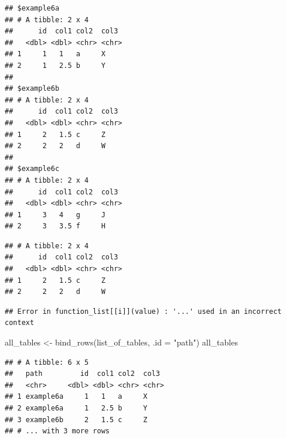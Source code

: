 \documentclass[]{book}
\newenvironment{Shaded}{}{}
\newcommand{\DataTypeTok}[1]{#1}
\newcommand{\KeywordTok}[1]{\textcolor[rgb]{0.00,0.00,1.00}{#1}}
\newcommand{\NormalTok}[1]{#1}
\newcommand{\OperatorTok}[1]{#1}
\newcommand{\StringTok}[1]{\textcolor[rgb]{0.00,0.50,0.50}{#1}}
\begin{document}
\begin{verbatim}
## $example6a
## # A tibble: 2 x 4
##      id  col1 col2  col3 
##   <dbl> <dbl> <chr> <chr>
## 1     1   1   a     X    
## 2     1   2.5 b     Y    
## 
## $example6b
## # A tibble: 2 x 4
##      id  col1 col2  col3 
##   <dbl> <dbl> <chr> <chr>
## 1     2   1.5 c     Z    
## 2     2   2   d     W    
## 
## $example6c
## # A tibble: 2 x 4
##      id  col1 col2  col3 
##   <dbl> <dbl> <chr> <chr>
## 1     3   4   g     J    
## 2     3   3.5 f     H
\end{verbatim}

\begin{Shaded}
\end{Shaded}

\begin{verbatim}
## # A tibble: 2 x 4
##      id  col1 col2  col3 
##   <dbl> <dbl> <chr> <chr>
## 1     2   1.5 c     Z    
## 2     2   2   d     W
\end{verbatim}

\begin{Shaded}
\end{Shaded}

\begin{verbatim}
## Error in function_list[[i]](value) : '...' used in an incorrect context
\end{verbatim}

\begin{Shaded}
\begin{Highlighting}[]
\NormalTok{all_tables <-}\StringTok{ }\KeywordTok{bind_rows}\NormalTok{(list_of_tables, }\DataTypeTok{.id =} \StringTok{"path"}\NormalTok{)}
\NormalTok{all_tables}
\end{Highlighting}
\end{Shaded}

\begin{verbatim}
## # A tibble: 6 x 5
##   path         id  col1 col2  col3 
##   <chr>     <dbl> <dbl> <chr> <chr>
## 1 example6a     1   1   a     X    
## 2 example6a     1   2.5 b     Y    
## 3 example6b     2   1.5 c     Z    
## # ... with 3 more rows
\end{verbatim}
\end{document}
